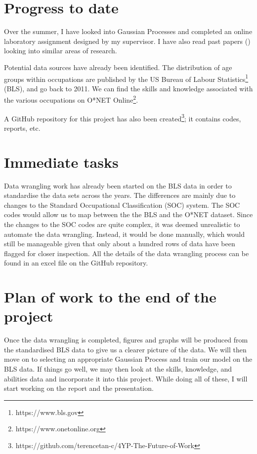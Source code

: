 \documentclass[11pt]{article}
\begin{document}
  
\section{Progress to date}
Over the summer, I have looked into Gaussian Processes and completed an online laboratory assignment designed by my supervisor. I have also read past papers (\cite{futureofemployment}) looking into similar areas of research.

Potential data sources have already been identified. The distribution of age groups within occupations are published by the US Bureau of Labour Statistics\footnote{https://www.bls.gov} (BLS), and go back to 2011. We can find the skills and knowledge associated with the various occupations on O*NET Online\footnote{https://www.onetonline.org}.

A GitHub repository for this project has also been created\footnote{https://github.com/terencetan-c/4YP-The-Future-of-Work}; it contains codes, reports, etc.


  

    
  \section{Immediate tasks}
  Data wrangling work has already been started on the BLS data in order to standardise the data sets across the years. The differences are mainly due to changes to the Standard Occupational Classification (SOC) system. The SOC codes would allow us to map between the the BLS and the O*NET dataset. Since the changes to the SOC codes are quite complex, it was deemed unrealistic to automate the data wrangling. Instead, it would be done manually, which would still be manageable given that only about a hundred rows of data have been flagged for closer inspection. All the details of the data wrangling process can be found in an excel file on the GitHub repository.

  \section{Plan of work to the end of the project}
  Once the data wrangling is completed, figures and graphs will be produced from the standardised BLS data to give us a clearer picture of the data. We will then move on to selecting an appropriate Gaussian Process and train our model on the BLS data. If things go well, we may then look at the skills, knowledge, and abilities data and incorporate it into this project. While doing all of these, I will start working on the report and the presentation.
\end{document}
